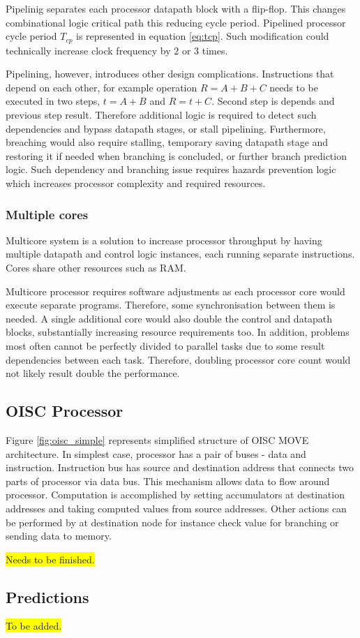 Pipelinig separates each processor datapath block with a flip-flop. This changes combinational logic critical path this reducing cycle period. Pipelined processor cycle period $T_{cp}$ is represented in equation \ref{eq:tcp}. Such modification could technically increase clock frequency by 2 or 3 times.

Pipelining, however, introduces other design complications. Instructions that depend on each other, for example operation $R = A + B + C$ needs to be executed in two steps, $t = A + B$ and $R = t + C$. Second step is depends and previous step result. Therefore additional logic is required to detect such dependencies and bypass datapath stages, or stall pipelining. Furthermore, breaching would also require stalling, temporary saving datapath stage and restoring it if needed when branching is concluded, or further branch prediction logic. Such dependency and branching issue requires hazards prevention logic which increases processor complexity and required resources. 

\subsubsection{Multiple cores}

Multicore system is a solution to increase processor throughput by having multiple datapath and control logic instances, each running separate instructions. Cores share other resources such as RAM.

Multicore processor requires software adjustments as each processor core would execute separate programs. Therefore, some synchronisation between them is needed. A single additional core would also double the control and datapath blocks, substantially increasing resource requirements too. In addition, problems most often cannot be perfectly divided to parallel tasks due to some result dependencies between each task. Therefore, doubling processor core count would not likely result double the performance. 

\subsection{OISC Processor}

Figure \ref{fig:oisc_simple} represents simplified structure of OISC MOVE architecture. In simplest case, processor has a pair of buses - data and instruction. Instruction bus has source and destination address that connects two parts of processor via data bus. This mechanism allows data to flow around processor. Computation is accomplished by setting accumulators at destination addresses and taking computed values from source addresses. Other actions can be performed by at destination node for instance check value for branching or sending data to memory. 

\colorbox{yellow}{Needs to be finished.}

\subsection{Predictions}
\colorbox{yellow}{To be added.}
\vfill





